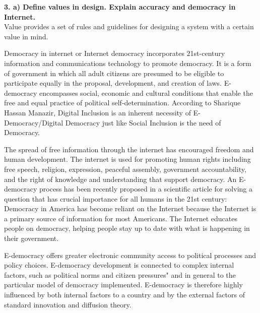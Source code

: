 \documentclass [12pt, a4paper]{article}
\begin{document}
\large
\textbf{3. a) Define values in design. Explain accuracy and democracy in Internet.}\\
\normalsize
Value provides a set of rules and guidelines for designing a system with a certain value in mind.\\
\par
Democracy in internet or Internet democracy incorporates 21st-century information and communications technology to promote democracy. It is a form of government in which all adult citizens are presumed to be eligible to participate equally in the proposal, development, and creation of laws.  E-democracy encompasses social, economic and cultural conditions that enable the free and equal practice of political self-determination. According to Sharique Hassan Manazir, Digital Inclusion  is an inherent necessity of E-Democracy/Digital Democracy just like Social Inclusion is the need of Democracy. \\
\par
The spread of free information through the internet has encouraged freedom and human development. The internet is used for promoting human rights including free speech, religion, expression, peaceful assembly, government accountability, and the right of knowledge and understanding that support democracy. An E-democracy process has been recently proposed in a scientific article for solving a question that has crucial importance for all humans in the 21st century: Democracy in America has become reliant on the Internet because the Internet is a primary source of information for most Americans. The Internet educates people on democracy, helping people stay up to date with what is happening in their government.\\
\par
E-democracy offers greater electronic community access to political processes and policy choices. E-democracy development is connected to complex internal factors, such as political norms and citizen pressures" and in general to the particular model of democracy implemented. E-democracy is therefore highly influenced by both internal factors to a country and by the external factors of standard innovation and diffusion theory.\\
\end{document}
